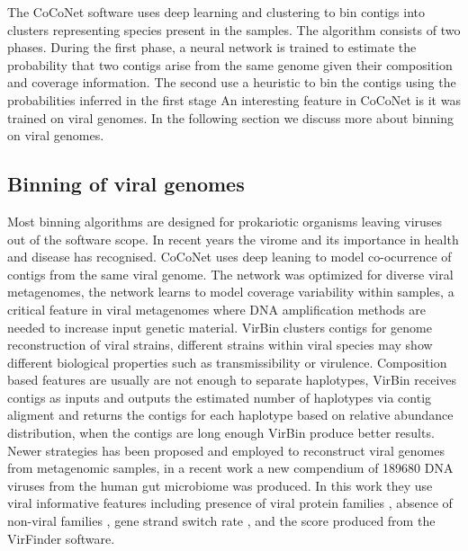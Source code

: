 \documentclass{article}
\begin{document}
The CoCoNet software uses deep learning and clustering to bin contigs into clusters representing species present in the samples.
The algorithm consists of two phases.
During the first phase, a neural network is trained to estimate the probability that two contigs arise from the same genome given their composition and coverage information.
The second use a heuristic to bin the contigs using the probabilities inferred in the first stage
An interesting feature in CoCoNet is it was trained on viral genomes. In the following section we discuss more about binning on viral genomes. 

\subsection{Binning of viral genomes}
Most binning algorithms are designed for prokariotic organisms leaving viruses out of the software scope.
In recent years the virome and its importance in health and disease has recognised.
CoCoNet uses deep leaning to model co-ocurrence of contigs from the same viral genome.
The network was optimized for diverse viral metagenomes, the network learns to model coverage variability within samples, a critical feature in viral metagenomes where DNA amplification methods are needed to increase input genetic material.
VirBin clusters contigs for genome reconstruction of viral strains, different strains within viral species may show different biological properties such as transmissibility or virulence. Composition based features are usually are not enough to separate haplotypes, VirBin receives contigs as inputs and outputs the estimated number of haplotypes via contig aligment and returns the contigs for each haplotype based on relative abundance distribution, when the contigs are long enough VirBin produce better results.
Newer strategies has been proposed and employed to reconstruct viral genomes from metagenomic samples, in a recent work \cite{nayfach2021metagenomic} a new compendium of 189680 DNA viruses from the human gut microbiome was produced.
In this work they use viral informative features including presence of viral protein families \cite{paez2016uncovering}, absence of non-viral families \cite{el2019pfam}, gene strand switch rate \cite{roux2005combined}, and the score produced from the VirFinder \cite{ren2017virfinder} software.
\end{document}

